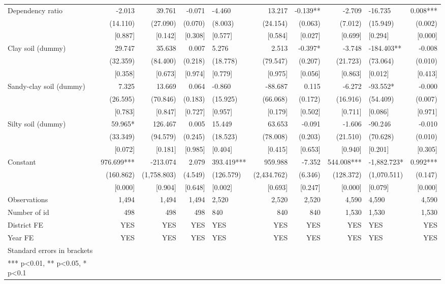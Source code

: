 \documentclass[
]{article}
\begin{document}
\begin{landscape}
\begin{ThreePartTable}
\begin{longtable}[t]{lrrrlrrrlr}
Dependency ratio & -2.013 & 39.761 & -0.071 & -4.460 & 13.217 & -0.139** & -2.709 & -16.735 & 0.008***\\
 & (14.110) & (27.090) & (0.070) & (8.003) & (24.154) & (0.063) & (7.012) & (15.949) & (0.002)\\
 & {}[0.887] & {}[0.142] & {}[0.308] & {}[0.577] & {}[0.584] & {}[0.027] & {}[0.699] & {}[0.294] & {}[0.000]\\
Clay soil (dummy) & 29.747 & 35.638 & 0.007 & 5.276 & 2.513 & -0.397* & -3.748 & -184.403** & -0.008\\
 & (32.359) & (84.400) & (0.218) & (18.778) & (79.547) & (0.207) & (21.723) & (73.064) & (0.010)\\
 & {}[0.358] & {}[0.673] & {}[0.974] & {}[0.779] & {}[0.975] & {}[0.056] & {}[0.863] & {}[0.012] & {}[0.413]\\
Sandy-clay soil (dummy) & 7.325 & 13.669 & 0.064 & -0.860 & -88.687 & 0.115 & -6.272 & -93.552* & -0.000\\
 & (26.595) & (70.846) & (0.183) & (15.925) & (66.068) & (0.172) & (16.916) & (54.409) & (0.007)\\
 & {}[0.783] & {}[0.847] & {}[0.727] & {}[0.957] & {}[0.179] & {}[0.502] & {}[0.711] & {}[0.086] & {}[0.971]\\
Silty soil (dummy) & 59.965* & 126.467 & 0.005 & 15.449 & 63.653 & -0.091 & -1.606 & -90.246 & -0.010\\
 & (33.349) & (94.579) & (0.245) & (18.523) & (78.008) & (0.203) & (21.510) & (70.628) & (0.010)\\
 & {}[0.072] & {}[0.181] & {}[0.985] & {}[0.404] & {}[0.415] & {}[0.653] & {}[0.940] & {}[0.201] & {}[0.305]\\
Constant & 976.699*** & -213.074 & 2.079 & 393.419*** & 959.988 & -7.352 & 544.008*** & -1,882.723* & 0.992***\\
 & (160.862) & (1,758.803) & (4.549) & (126.579) & (2,434.762) & (6.346) & (128.372) & (1,070.511) & (0.147)\\
 & {}[0.000] & {}[0.904] & {}[0.648] & {}[0.002] & {}[0.693] & {}[0.247] & {}[0.000] & {}[0.079] & {}[0.000]\\
Observations & 1,494 & 1,494 & 1,494 & 2,520 & 2,520 & 2,520 & 4,590 & 4,590 & 4,590\\
Number of id & 498 & 498 & 498 & 840 & 840 & 840 & 1,530 & 1,530 & 1,530\\
District FE & YES & YES & YES & YES & YES & YES & YES & YES & YES\\
Year FE & YES & YES & YES & YES & YES & YES & YES & YES & YES\\
Standard errors in brackets &  &  &  &  &  &  &  &  & \\
*** p<0.01, ** p<0.05, * p<0.1 &  &  &  &  &  &  &  &  & \\*
\end{longtable}
\end{ThreePartTable}
\endgroup{}
\end{landscape}
\end{document}
